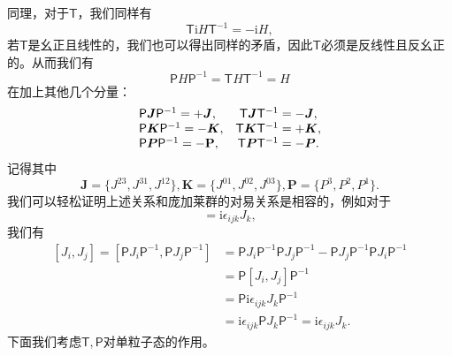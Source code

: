 同理，对于$\mathsf{T}$，我们同样有
\begin{equation*}
	\mathsf{T}\mathrm{i} H\mathsf{T}^{-1} =-\mathrm{i} H,
\end{equation*}
若$\mathsf{T}$是幺正且线性的，我们也可以得出同样的矛盾，因此$\mathsf{T}$必须是反线性且反幺正的。从而我们有
\begin{equation*}
	\mathsf{P} H\mathsf{P}^{-1} =\mathsf{T} H\mathsf{T}^{-1} =H
\end{equation*}
在加上其他几个分量：
\begin{equation*}
	\begin{array}{ l c }
		\mathsf{P}\boldsymbol{J}\mathsf{P}^{-1} =+\boldsymbol{J} , & \mathsf{T}\boldsymbol{J}\mathsf{T}^{-1} =-\boldsymbol{J} ,\\
		\mathsf{P}\boldsymbol{K}\mathsf{P}^{-1} =-\boldsymbol{K} , & \mathsf{T}\boldsymbol{K}\mathsf{T}^{-1} =+\boldsymbol{K} ,\\
		\mathsf{P}\boldsymbol{P}\mathsf{P}^{-1} =-\mathbf{P} , & \mathsf{T}\boldsymbol{P}\mathsf{T}^{-1} =-\boldsymbol{P} .
	\end{array}
\end{equation*}
记得其中
\begin{equation*}
	\boldsymbol{J} =\{J^{23} ,J^{31} ,J^{12} \},\boldsymbol{K} =\{J^{01} ,J^{02} ,J^{03} \},\boldsymbol{P} =\{P^{3} ,P^{2} ,P^{1} \}.
\end{equation*}
我们可以轻松证明上述关系和庞加莱群的对易关系是相容的，例如对于
\begin{equation*}
	[ J_{i} ,J_{j}] =\mathrm{i} \epsilon _{ijk} J_{k} ,
\end{equation*}
我们有
\begin{equation*}
	\begin{aligned}
		[ J_{i} ,J_{j}] =[\mathsf{P} J_{i}\mathsf{P}^{-1} ,\mathsf{P} J_{j}\mathsf{P}^{-1} ] & =\mathsf{P} J_{i}\mathsf{P}^{-1}\mathsf{P} J_{j}\mathsf{P}^{-1} -\mathsf{P} J_{j}\mathsf{P}^{-1}\mathsf{P} J_{i}\mathsf{P}^{-1}\\
		& =\mathsf{P} [J_{i} ,J_{j} ]\mathsf{P}^{-1}\\
		& =\mathsf{P}\mathrm{i} \epsilon _{ijk} J_{k}\mathsf{P}^{-1}\\
		& =\mathrm{i} \epsilon _{ijk}\mathsf{P} J_{k}\mathsf{P}^{-1} =\mathrm{i} \epsilon _{ijk} J_{k} .
	\end{aligned}
\end{equation*}
下面我们考虑$\mathsf{T} ,\mathsf{P}$对单粒子态的作用。

